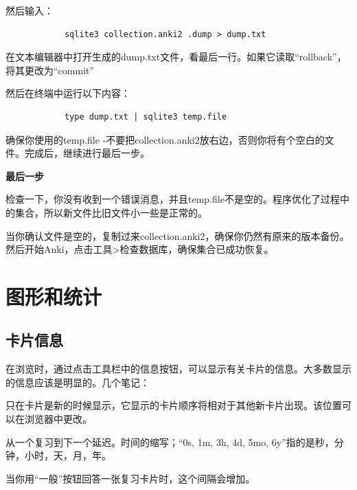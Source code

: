 \documentclass[a4paper]{book}
\begin{document}
		然后输入：
		
		\begin{shaded}\begin{verbatim}
			sqlite3 collection.anki2 .dump > dump.txt
			\end{verbatim}\end{shaded}
		
		在文本编辑器中打开生成的dump.txt文件，看最后一行。如果它读取“rollback”，将其更改为“commit”
		
		然后在终端中运行以下内容：
		
		\begin{shaded}\begin{verbatim}
			type dump.txt | sqlite3 temp.file
			\end{verbatim}\end{shaded}
		
		确保你使用的temp.file -不要把collection.anki2放右边，否则你将有个空白的文件。完成后，继续进行最后一步。
		
		\textbf{最后一步}
		
		检查一下，你没有收到一个错误消息，并且temp.file不是空的。程序优化了过程中的集合，所以新文件比旧文件小一些是正常的。
		
		当你确认文件是空的，复制过来collection.anki2，确保你仍然有原来的版本备份。然后开始Anki，点击工具>检查数据库，确保集合已成功恢复。
		
		\chapter{图形和统计}\label{}
		
		\section{卡片信息}
		
		在浏览时，通过点击工具栏中的信息按钮，可以显示有关卡片的信息。大多数显示的信息应该是明显的。几个笔记：
		
		\begin{description}
			\itemsep1pt\parskip0pt
			\item[位置] 只在卡片是新的时候显示，它显示的卡片顺序将相对于其他新卡片出现。该位置可以在浏览器中更改。
			\item[时间间隔] 从一个复习到下一个延迟。时间的缩写；“0s, 1m, 3h, 4d, 5mo, 6y”指的是秒，分钟，小时，天，月，年。
			\item[容易] 当你用“一般”按钮回答一张复习卡片时，这个间隔会增加。               
		\end{description}
		
\end{document}
